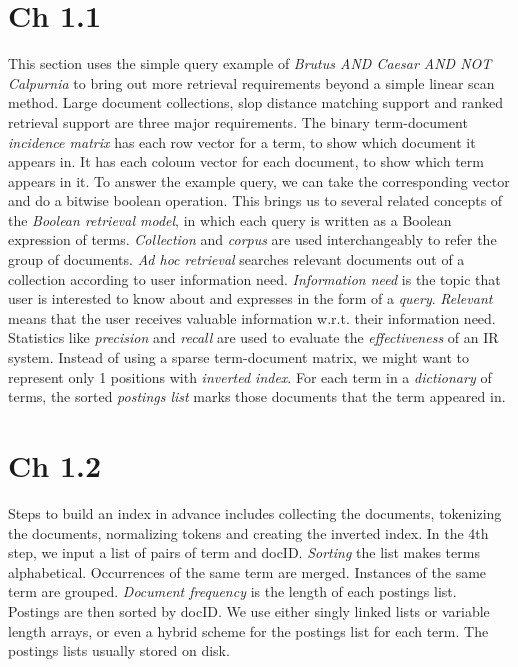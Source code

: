 \documentclass{sig-alternate-05-2015}
\begin{document}
\section{Ch 1.1}
This section uses the simple query example of \textit{Brutus AND Caesar AND NOT Calpurnia} to bring out more retrieval requirements beyond a simple linear scan method. Large document collections, slop distance matching support and ranked retrieval support are three major requirements. The binary term-document \textit{incidence matrix} has each row vector for a term, to show which document it appears in. It has each coloum vector for each document, to show which term appears in it. To answer the example query, we can take the corresponding vector and do a bitwise boolean operation. This brings us to several related concepts of the \textit{Boolean retrieval model}, in which each query is written as a Boolean expression of terms. \textit{Collection} and \textit{corpus} are used interchangeably to refer the group of documents. \textit{Ad hoc retrieval} searches relevant documents out of a collection according to user information need. \textit{Information need} is the topic that user is interested to know about and expresses in the form of a \textit{query}. \textit{Relevant} means that the user receives valuable information w.r.t. their information need. Statistics like \textit{precision} and \textit{recall} are used to evaluate the \textit{effectiveness} of an IR system. Instead of using a sparse term-document matrix, we might want to represent only 1 positions with \textit{inverted index}. For each term in a \textit{dictionary} of terms, the sorted \textit{postings list} marks those documents that the term appeared in. 

\section{Ch 1.2}
Steps to build an index in advance includes collecting the documents, tokenizing the documents, normalizing tokens and creating the inverted index. In the 4th step, we input a list of pairs of term and docID. \textit{Sorting} the list makes terms alphabetical. Occurrences of the same term are merged. Instances of the same term are grouped. \textit{Document frequency} is the length of each postings list. Postings are then sorted by docID. We use either singly linked lists or variable length arrays, or even a hybrid scheme for the postings list for each term. The postings lists usually stored on disk.
\end{document}
